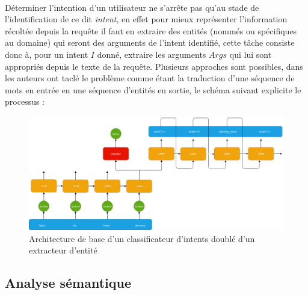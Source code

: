 		\paragraph{}
		Déterminer l'intention d'un utilisateur ne s'arrête pas qu'au stade de l'identification de ce dit \textit{intent}, en effet pour mieux représenter l'information récoltée depuis la requête il faut en extraire des entités (nommés ou spécifiques au domaine) qui seront des arguments de l'intent identifié, cette tâche consiste donc à, pour un intent $I$ donné, extraire les arguments $Args$ qui lui sont appropriés depuis le texte de la requête. Plusieurs approches sont possibles, dans \cite{intent_slots} les auteurs ont taclé le problème comme étant la traduction d'une séquence de mots en entrée en une séquence d'entités en sortie, le schéma suivant explicite le processus :
		\begin{figure}[H]
			\centering
			\label{LSTM_slots}
			\includegraphics[width=0.80\linewidth]{images/NLU/seq2seq.png}
			\caption{Architecture de base d'un classificateur d'intents doublé d'un extracteur d'entité \cite{intent_slots}}
		\end{figure} 
	\subsection{Analyse sémantique}
